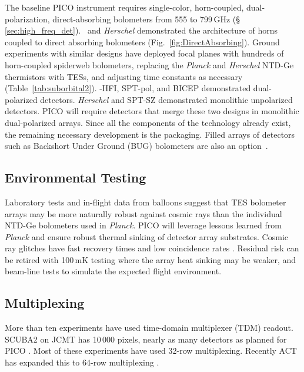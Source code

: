 The baseline PICO instrument requires single-color, horn-coupled, dual-polarization, direct-absorbing bolometers from 555 to 799\,GHz (\S\,\ref{sec:high_freq_det}).  \planck\ and \textit{Herschel} demonstrated the architecture of horns coupled to direct absorbing bolometers (Fig.~\ref{fig:DirectAbsorbing}).    Ground experiments with similar designs have deployed focal planes with hundreds of horn-coupled spiderweb bolometers, replacing the \textit{Planck} and \textit{Herschel} NTD-Ge thermistors with TESs, and adjusting time constants as necessary (Table~\ref{tab:suborbital2}). \planck -HFI, SPT-pol, and BICEP demonstrated dual-polarized detectors. \textit{Herschel} and SPT-SZ demonstrated monolithic unpolarized detectors. PICO will require detectors that merge these two designs in monolithic dual-polarized arrays. Since all the components of the technology already exist, the remaining necessary development is the packaging. Filled arrays of detectors such as Backshort Under Ground (BUG) bolometers are also an option~\citep{Staguhn2006}.




\subsection{Environmental Testing}
\label{sec:env_testing}

Laboratory tests and in-flight data from balloons suggest that TES
bolometer arrays may be more naturally robust against cosmic rays than
the individual NTD-Ge bolometers used in \textit{Planck}. PICO will leverage lessons
learned from \textit{Planck} and ensure robust thermal sinking of
detector array substrates. Cosmic ray
glitches have fast recovery times and low coincidence rates
\citep{SPIDER2018,Filippini_inprep}. Residual risk can be retired with 100\,mK
testing where the array heat sinking may be weaker, and beam-line
tests to simulate the expected flight environment.

\subsection{Multiplexing}
\label{sec:multiplexing}

More than ten experiments have used time-domain multiplexer (TDM)
readout. SCUBA2 on JCMT has 10\,000 pixels, nearly as many detectors
as planned for PICO \citep{Holland2013}. Most of these experiments
have used 32-row multiplexing. Recently ACT has expanded this to
64-row multiplexing \citep{Henderson2016}.

